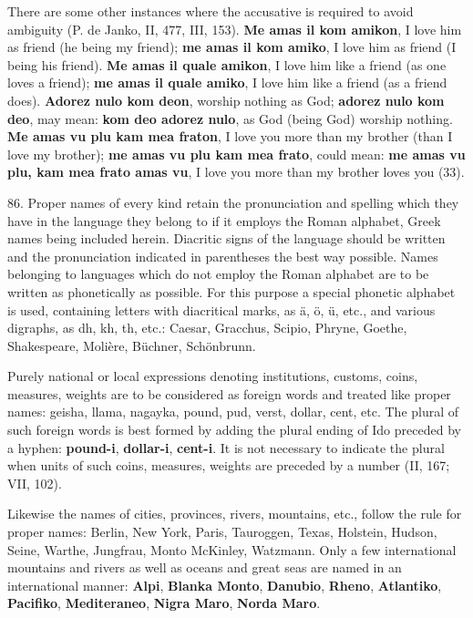 There are some other instances where the accusative is required to avoid ambiguity (P. de Janko, II, 477, III, 153). \textbf{Me amas il kom amikon}, I love him as friend (he being my friend); \textbf{me amas il kom amiko}, I love him as friend (I being his friend). \textbf{Me amas il quale amikon}, I love him like a friend (as one loves a friend); \textbf{me amas il quale amiko}, I love him like a friend (as a friend does). \textbf{Adorez nulo kom deon}, worship nothing as God; \textbf{adorez nulo kom deo}, may mean: \textbf{kom deo adorez nulo}, as God (being God) worship nothing. \textbf{Me amas vu plu kam mea fraton}, I love you more than my brother (than I love my brother); \textbf{me amas vu plu kam mea frato}, could mean: \textbf{me amas vu plu, kam mea frato amas vu}, I love you more than my brother loves you (33). 

86. Proper names of every kind retain the pronunciation and spelling which they have in the language they belong to if it employs the Roman alphabet, Greek names being included herein. Diacritic signs of the language should be written and the pronunciation indicated in parentheses the best way possible. Names belonging to languages which do not employ the Roman alphabet are to be written as phonetically as possible. For this purpose a special phonetic alphabet is used, containing letters with diacritical marks, as ä, ö, ü, etc., and various digraphs, as dh, kh, th, etc.: Caesar, Gracchus, Scipio, Phryne, Goethe, Shakespeare, Molière, Büchner, Schönbrunn. 

Purely national or local expressions denoting institutions, customs, coins, measures, weights are to be considered as foreign words and treated like proper names: geisha, llama, nagayka, pound, pud, verst, dollar, cent, etc. The plural of such foreign words is best formed by adding the plural ending of Ido preceded by a hyphen: \textbf{pound-i}, \textbf{dollar-i}, \textbf{cent-i}. It is not necessary to indicate the plural when units of such coins, measures, weights are preceded by a number (II, 167; VII, 102). 

Likewise the names of cities, provinces, rivers, mountains, etc., follow the rule for proper names: Berlin, New York, Paris, Tauroggen, Texas, Holstein, Hudson, Seine, Warthe, Jungfrau, Monto McKinley, Watzmann. Only a few international mountains and rivers as well as oceans and great seas are named in an international manner: \textbf{Alpi}, \textbf{Blanka Monto}, \textbf{Danubio}, \textbf{Rheno}, \textbf{Atlantiko}, \textbf{Pacifiko}, \textbf{Mediteraneo}, \textbf{Nigra Maro}, \textbf{Norda Maro}. 

